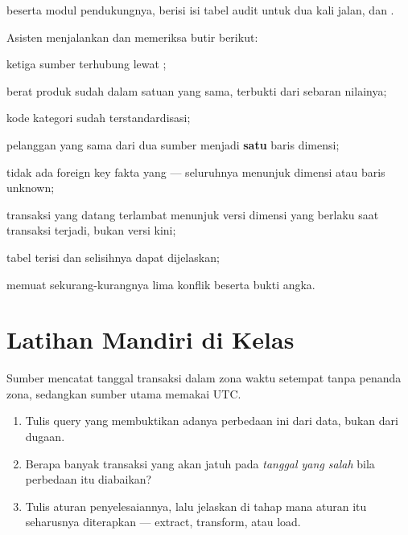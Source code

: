 \begin{luaran}
 beserta modul pendukungnya,
 berisi isi tabel audit untuk dua kali jalan, dan
.
\end{luaran}

\begin{checkpoint}
Asisten menjalankan  dan memeriksa butir berikut:
\begin{ceklis}
  \item ketiga sumber terhubung lewat ;
  \item berat produk sudah dalam satuan yang sama, terbukti dari sebaran
        nilainya;
  \item kode kategori sudah terstandardisasi;
  \item pelanggan yang sama dari dua sumber menjadi \textbf{satu} baris
        dimensi;
  \item tidak ada foreign key fakta yang  --- seluruhnya
        menunjuk dimensi atau baris unknown;
  \item transaksi yang datang terlambat menunjuk versi dimensi yang berlaku
        saat transaksi terjadi, bukan versi kini;
  \item tabel  terisi dan selisihnya dapat dijelaskan;
  \item {} memuat sekurang-kurangnya lima konflik
        beserta bukti angka.
\end{ceklis}
\end{checkpoint}

\section{Latihan Mandiri di Kelas}


Sumber  mencatat tanggal transaksi dalam zona waktu
setempat tanpa penanda zona, sedangkan sumber utama memakai UTC.

\begin{enumerate}[leftmargin=1.4em]
  \item Tulis query yang membuktikan adanya perbedaan ini dari data, bukan dari
        dugaan.
  \item Berapa banyak transaksi yang akan jatuh pada \emph{tanggal yang salah}
        bila perbedaan itu diabaikan?
  \item Tulis aturan penyelesaiannya, lalu jelaskan di tahap mana aturan itu
        seharusnya diterapkan --- extract, transform, atau load.
\end{enumerate}

